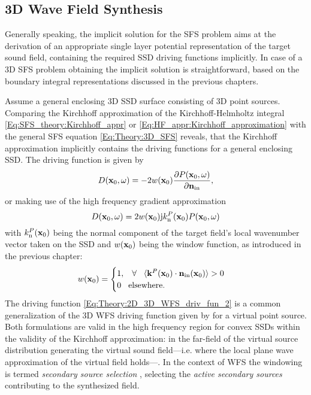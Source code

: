 \subsection{3D Wave Field Synthesis}

Generally speaking, the implicit solution for the SFS problem aims at the derivation of an appropriate single layer potential representation of the target sound field, containing the required SSD driving functions implicitly.
In case of a 3D SFS problem obtaining the implicit solution is straightforward, based on the boundary integral representations discussed in the previous chapters.

Assume a general enclosing 3D SSD surface consisting of 3D point sources.
Comparing the Kirchhoff approximation of the Kirchhoff-Helmholtz integral \eqref{Eq:SFS_theory:Kirchhoff_appr} or \eqref{Eq:HF_appr:Kirchhoff_approximation} with the general SFS equation \eqref{Eq:Theory:3D_SFS} reveals, that the Kirchhoff approximation implicitly contains the driving functions for a general enclosing SSD. 
The driving function is given by
\begin{equation}
D(\mathbf{x}_0,\omega) = - 2w(\mathbf{x}_0)\frac{\partial P(\mathbf{x}_0,\omega)}{\partial \mathbf{n}_{\mathrm{in}}}, 
\label{Eq:Theory:2D_3D_WFS_driv_fun}
\end{equation}
or making use of the high frequency gradient approximation
\begin{equation}
D(\mathbf{x}_0,\omega) = 2 w(\mathbf{x}_0) \mathrm{j} k_{\mathrm{n}}^P(\mathbf{x}_0) P(\mathbf{x}_0,\omega)
\label{Eq:Theory:2D_3D_WFS_driv_fun_2}
\end{equation}
with $k_{\mathrm{n}}^P(\mathbf{x}_0)$ being the normal component of the target field's local wavenumber vector taken on the SSD and $w(\mathbf{x}_0)$ being the window function, as introduced in the previous chapter:
\begin{equation}
w(\mathbf{x}_0) = \begin{cases}
                        1, \hspace{3mm} \forall \hspace{3mm} \langle \mathbf{k}^P(\mathbf{x}_0) \cdot \mathbf{n}_{\text{in}}(\mathbf{x}_0) \rangle > 0 \\
                        0  \hspace{3mm} \text{elsewhere}.
                    \end{cases}
\end{equation}
The driving function \eqref{Eq:Theory:2D_3D_WFS_driv_fun_2} is a common generalization of the 3D WFS driving function given by \cite[Eq. 20.]{Zotter2013:uniqueness} for a virtual point source.
Both formulations are valid in the high frequency region for convex SSDs within the validity of the Kirchhoff approximation: in the far-field of the virtual source distribution generating the virtual sound field---i.e. where the local plane wave approximation of the virtual field holds---.
In the context of WFS the windowing is termed \emph{secondary source selection} \cite{Spors2007, Spors2007:DAGA:SS_selection_criterion}, selecting the \emph{active secondary sources} contributing to the synthesized field. 

